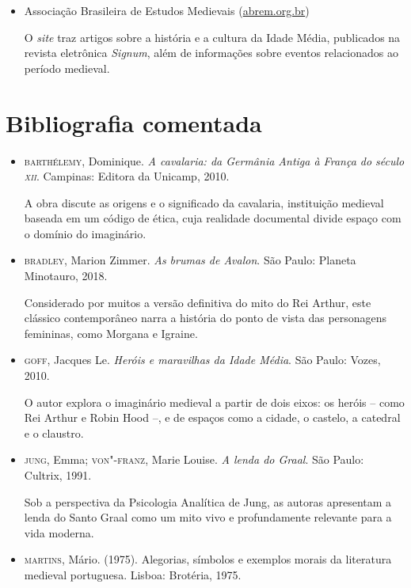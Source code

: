 \documentclass[11pt]{extarticle}
\begin{document}
\begin{itemize}
\item Associação Brasileira de Estudos Medievais
(\href{www.abrem.org.br}{abrem.org.br})

O \emph{site} traz artigos sobre a história e a cultura da Idade 
Média, publicados na revista eletrônica \emph{Signum}, além de 
informações sobre eventos relacionados ao período medieval.
\end{itemize}

\section{Bibliografia comentada}

\begin{itemize}
\item\textsc{barthélemy}, Dominique. \textit{A cavalaria: da Germânia Antiga à França do século \textsc{xii}}. Campinas: Editora da Unicamp, 2010.

A obra discute as origens e o significado da cavalaria, instituição 
medieval baseada em um código de ética, cuja realidade documental 
divide espaço com o domínio do imaginário.

\item\textsc{bradley}, Marion Zimmer. \textit{As brumas de Avalon}. São Paulo: Planeta Minotauro, 2018.

Considerado por muitos a versão definitiva do mito do Rei Arthur, este
clássico contemporâneo narra a história do ponto de vista das
personagens femininas, como Morgana e Igraine.

\item\textsc{goff}, Jacques Le. \textit{Heróis e maravilhas da Idade Média}. São
Paulo: Vozes, 2010.

O autor explora o imaginário medieval a partir de dois eixos: os
heróis -- como Rei Arthur e Robin Hood --, e de espaços como a cidade,
o castelo, a catedral e o claustro.

\item\textsc{jung}, Emma; \textsc{von"-franz}, Marie Louise. \textit{A lenda do Graal}. São
Paulo: Cultrix, 1991.

Sob a perspectiva da Psicologia Analítica de Jung, as autoras
apresentam a lenda do Santo Graal como um mito vivo e profundamente
relevante para a vida moderna.

\item\textsc{martins}, Mário. (1975). Alegorias, símbolos e exemplos morais da
literatura medieval portuguesa. Lisboa: Brotéria, 1975.


\end{itemize}
\end{document}
